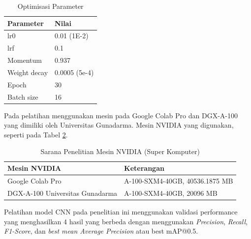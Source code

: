 \begin{singlespace}
	\begin{table}[H]
		\centering
		\caption{Optimisasi Parameter}
		\label{tbl:Optimisasi-Parameter2}
		\begin{tabular}{|m{5cm}|m{5cm}|}
			\hline
			\rowcolor[HTML]{D9D9D9} 
			Parameter    & Nilai         \\ \hline
			lr0          & 0.01 (1E-2)   \\ \hline
			lrf          & 0.1           \\ \hline
			Momentum     & 0.937         \\ \hline
			Weight decay & 0.0005 (5e-4) \\ \hline
			Epoch        & 30            \\ \hline
			Batch size   & 16            \\ \hline
		\end{tabular}
	\end{table}
\end{singlespace}

Pada pelatihan menggunakan mesin pada Google Colab Pro dan DGX-A-100 yang dimiliki oleh Universitas Gunadarma. Mesin NVIDIA yang digunakan, seperti pada Tabel \ref{tbl:Sarana-Penelitian-Mesin-Nvidia}.


\begin{singlespace}
	\begin{table}[H]
		\centering
		\caption{Sarana Penelitian Mesin NVIDIA (Super Komputer)}
		\label{tbl:Sarana-Penelitian-Mesin-Nvidia}
		\begin{tabular}{|m{5cm}|m{5cm}|}
			\hline
			\rowcolor[HTML]{D9D9D9} 
			Mesin NVIDIA                    & Keterangan                       \\ \hline
			Google Colab Pro                & A-100-SXM4-40GB, 40536.1875 MB   \\ \hline
			DGX-A-100 Universitas Gunadarma & A-100-SXM4-40GB, 20096 MB        \\ \hline
		\end{tabular}
	\end{table}
\end{singlespace}

Pelatihan model CNN pada penelitian ini menggunakan validasi performance yang menghasilkan 4 hasil yang berbeda dengan menggunakan \textit{Precision}, \textit{Recall}, \textit{F1-Score}, dan \textit{best mean Average Precision} atau best mAP@0.5.

